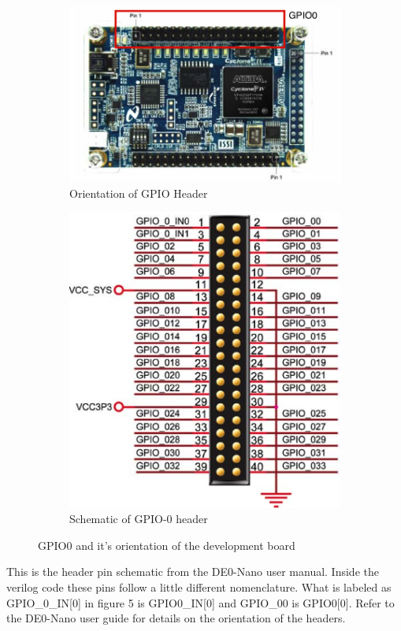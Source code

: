         \begin{figure}
          \centering
          \begin{subfigure}[b]{.38\textwidth}
            \includegraphics[angle=270, width=.9\textwidth]{Images/LabeledGPIOHeaders.jpg}
            \caption{Orientation of GPIO Header\cite{DE0Manual}}
          \end{subfigure}
          \begin{subfigure}[b]{.45\textwidth}
            \includegraphics[width=\textwidth]{Images/GPIOHeader.jpg}
            \caption{Schematic of GPIO-0 header\cite{DE0Manual}}
          \end{subfigure}
          \caption{GPIO0 and it's orientation of the development board}
          \label{pinmap}
        \end{figure}
        This is the header pin schematic from the DE0-Nano user manual. Inside the verilog code these pins follow a little different nomenclature. What is labeled as GPIO\_0\_IN[0] in figure 5 is GPIO0\_IN[0] and GPIO\_00 is GPIO0[0]. Refer to the DE0-Nano user guide for details on the orientation of the headers.

